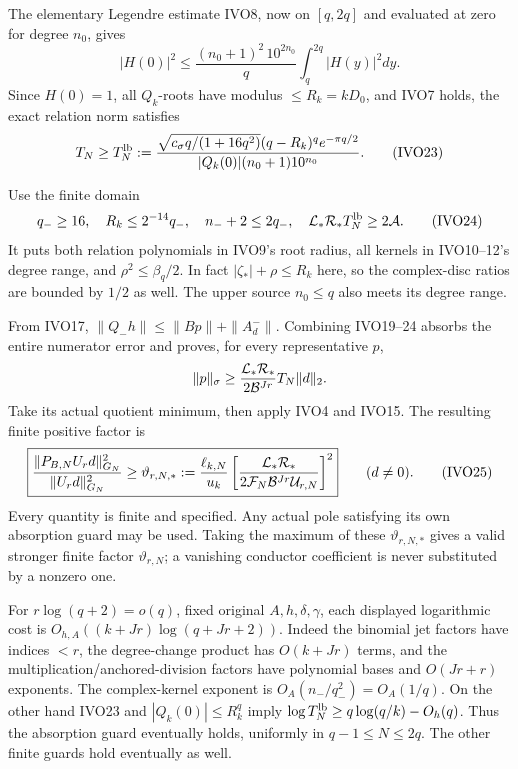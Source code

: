 \documentclass[11pt]{article}
\begin{document}
The elementary Legendre estimate IVO8, now on \([q,2q]\) and evaluated at zero for degree \(n_0\), gives \[
|H(0)|^2\le\frac{(n_0+1)^2\,10^{2n_0}}q\int_q^{2q}|H(y)|^2dy.
\] Since \(H(0)=1\), all \(Q_k\)-roots have modulus \(\le R_k=kD_0\), and IVO7 holds, the exact relation norm satisfies \[
T_N\ge T_N^{\rm lb}:=
\frac{\sqrt{c_\sigma q/(1+16q^2)}(q-R_k)^q e^{-\pi q/2}}
{|Q_k(0)|(n_0+1)10^{n_0}}.
\tag{IVO23}
\]

Use the finite domain \[
q_-\ge16,\quad R_k\le2^{-14}q_-,\quad
n_-+2\le2q_-,\quad
{\cal L}_*{\cal R}_*T_N^{\rm lb}\ge2{\cal A}.
\tag{IVO24}
\] It puts both relation polynomials in IVO9's root radius, all kernels in IVO10--12's degree range, and \(\rho^2\le\beta_q/2\). In fact \(|\zeta_*|+\rho\le R_k\) here, so the complex-disc ratios are bounded by \(1/2\) as well. The upper source \(n_0\le q\) also meets its degree range.

From IVO17, \(\|Q_-h\|\le\|Bp\|+\|A_d^-\|\). Combining IVO19--24 absorbs the entire numerator error and proves, for every representative \(p\), \[
\|p\|_\sigma\ge
\frac{{\cal L}_*{\cal R}_*}{2{\cal B}^{Jr}}T_N\|d\|_2.
\] Take its actual quotient minimum, then apply IVO4 and IVO15. The resulting finite positive factor is \[
\boxed{
\frac{\|P_{B,N}U_rd\|_{G_N}^2}{\|U_rd\|_{G_N}^2}
\ge\vartheta_{r,N,*}:=
\frac{\ell_{k,N}}{u_k}
\left[\frac{{\cal L}_*{\cal R}_*}
{2{\cal F}_N{\cal B}^{Jr}{\cal U}_{r,N}}\right]^2
}\qquad(d\ne0).
\tag{IVO25}
\] Every quantity is finite and specified. Any actual pole satisfying its own absorption guard may be used. Taking the maximum of these \(\vartheta_{r,N,*}\) gives a valid stronger finite factor \(\vartheta_{r,N}\); a vanishing conductor coefficient is never substituted by a nonzero one.

For \(r\log(q+2)=o(q)\), fixed original \(A,h,\delta,\gamma\), each displayed logarithmic cost is \(O_{h,A}((k+Jr)\log(q+Jr+2))\). Indeed the binomial jet factors have indices \(<r\), the degree-change product has \(O(k+Jr)\) terms, and the multiplication/anchored-division factors have polynomial bases and \(O(Jr+r)\) exponents. The complex-kernel exponent is \(O_A(n_-/q_-^2)=O_A(1/q)\). On the other hand IVO23 and \(|Q_k(0)|\le R_k^q\) imply \(\log T_N^{\rm lb}\ge q\log(q/k)-O_h(q)\). Thus the absorption guard eventually holds, uniformly in \(q-1\le N\le2q\). The other finite guards hold eventually as well.
\end{document}
